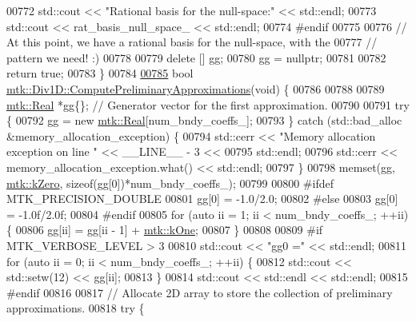 \begin{DoxyCode}
{{00772   std::cout << \textcolor{stringliteral}{"Rational basis for the null-space:"} << std::endl;
00773   std::cout << rat\_basis\_null\_space\_ << std::endl;
00774 \textcolor{preprocessor}{  #endif}
00775 
00776   \textcolor{comment}{// At this point, we have a rational basis for the null-space, with the}
00777   \textcolor{comment}{// pattern we need! :)}
00778 
00779   \textcolor{keyword}{delete} [] gg;
00780   gg = \textcolor{keyword}{nullptr};
00781 
00782   \textcolor{keywordflow}{return} \textcolor{keyword}{true};
00783 \}
00784 
\hypertarget{mtk__div__1d_8cc_source_l00785}{}\hyperlink{classmtk_1_1Div1D_a4be0534a4e22d44a7aedde326cc3f3b6}{00785} \textcolor{keywordtype}{bool} \hyperlink{classmtk_1_1Div1D_a4be0534a4e22d44a7aedde326cc3f3b6}{mtk::Div1D::ComputePreliminaryApproximations}(\textcolor{keywordtype}{void}) \{
00786 
00788 
00789   \hyperlink{group__c01-roots_gac080bbbf5cbb5502c9f00405f894857d}{mtk::Real} *gg\{\}; \textcolor{comment}{// Generator vector for the first approximation.}
00790 
00791   \textcolor{keywordflow}{try} \{
00792     gg = \textcolor{keyword}{new} \hyperlink{group__c01-roots_gac080bbbf5cbb5502c9f00405f894857d}{mtk::Real}[num\_bndy\_coeffs\_];
00793   \} \textcolor{keywordflow}{catch} (std::bad\_alloc &memory\_allocation\_exception) \{
00794     std::cerr << \textcolor{stringliteral}{"Memory allocation exception on line "} << \_\_LINE\_\_ - 3 <<
00795 std::endl;
00796     std::cerr << memory\_allocation\_exception.what() << std::endl;
00797   \}
00798   memset(gg, \hyperlink{group__c01-roots_ga59a451a5fae30d59649bcda274fea271}{mtk::kZero}, \textcolor{keyword}{sizeof}(gg[0])*num\_bndy\_coeffs\_);
00799 
00800 \textcolor{preprocessor}{  #ifdef MTK\_PRECISION\_DOUBLE}
00801   gg[0] = -1.0/2.0;
00802 \textcolor{preprocessor}{  #else}
00803   gg[0] = -1.0f/2.0f;
00804 \textcolor{preprocessor}{  #endif}
00805   \textcolor{keywordflow}{for} (\textcolor{keyword}{auto} ii = 1; ii < num\_bndy\_coeffs\_; ++ii) \{
00806     gg[ii] = gg[ii - 1] + \hyperlink{group__c01-roots_ga26407c24d43b6b95480943340d285c71}{mtk::kOne};
00807   \}
00808 
00809 \textcolor{preprocessor}{  #if MTK\_VERBOSE\_LEVEL > 3}
00810   std::cout << \textcolor{stringliteral}{"gg0 ="} << std::endl;
00811   \textcolor{keywordflow}{for} (\textcolor{keyword}{auto} ii = 0; ii < num\_bndy\_coeffs\_; ++ii) \{
00812     std::cout << std::setw(12) << gg[ii];
00813   \}
00814   std::cout << std::endl << std::endl;
00815 \textcolor{preprocessor}{  #endif}
00816 
00817   \textcolor{comment}{// Allocate 2D array to store the collection of preliminary approximations.}
00818   \textcolor{keywordflow}{try} \{
}}
\end{DoxyCode}
